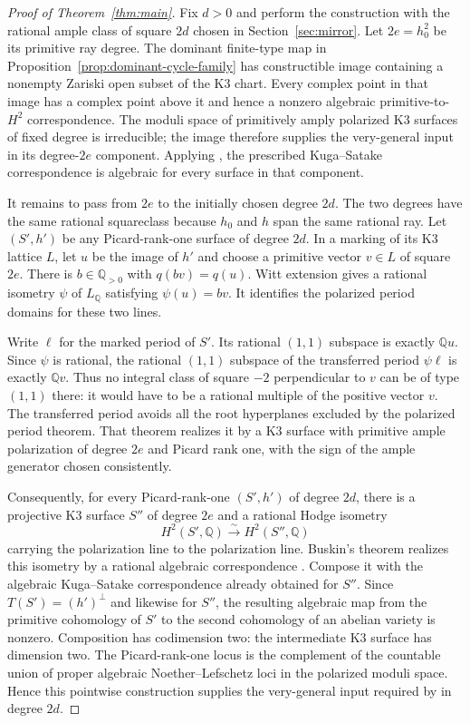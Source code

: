 \documentclass[11pt]{article}
\numberwithin{equation}{section}
\theoremstyle{definition}
\theoremstyle{remark}
\begin{document}
\begin{proof}[Proof of Theorem~\ref{thm:main}]
Fix $d>0$ and perform the construction with the rational ample
class of square $2d$ chosen in Section~\ref{sec:mirror}.
Let $2e=h_0^2$ be its primitive ray degree. The dominant finite-type
map in Proposition~\ref{prop:dominant-cycle-family} has constructible
image containing a nonempty Zariski open subset of the K3 chart.
Every complex point in that image has a complex point above it
and hence a nonzero algebraic primitive-to-$H^2$ correspondence.
The moduli space of primitively amply polarized K3 surfaces of
fixed degree is irreducible; the image therefore supplies the
very-general input in its degree-$2e$ component. Applying
\cite[Theorems~1.1--1.2]{R}, the prescribed Kuga--Satake
correspondence is algebraic for every surface in that component.

It remains to pass from $2e$ to the initially chosen degree $2d$.
The two degrees have the same rational squareclass because $h_0$
and $h$ span the same rational ray. Let $(S',h')$ be any
Picard-rank-one surface of degree $2d$. In a marking of its K3
lattice $L$, let $u$ be the image of $h'$ and choose a primitive
vector $v\in L$ of square $2e$.
There is $b\in\mathbb Q_{>0}$ with $q(bv)=q(u)$. Witt extension gives
a rational isometry $\psi$ of $L_\mathbb Q$ satisfying $\psi(u)=bv$.
It identifies the polarized period domains for these two lines.

Write $\ell$ for the marked period of $S'$. Its rational $(1,1)$ subspace is
exactly $\mathbb Q u$. Since $\psi$ is rational, the rational $(1,1)$
subspace of the transferred period $\psi\ell$ is exactly
$\mathbb Q v$. Thus no integral class of square $-2$ perpendicular to
$v$ can be of type $(1,1)$ there: it would have to be a rational
multiple of the positive vector $v$. The transferred period avoids
all the root hyperplanes excluded by the polarized period theorem.
That theorem realizes it by a K3 surface with primitive ample
polarization of degree $2e$ and Picard rank one, with the sign of
the ample generator chosen consistently.

Consequently, for every Picard-rank-one $(S',h')$ of degree $2d$,
there is a
projective K3 surface $S''$ of degree $2e$ and a rational Hodge
isometry
\[
 H^2(S',\mathbb Q)\xrightarrow{\sim}H^2(S'',\mathbb Q)
\]
carrying the polarization line to the polarization line.
Buskin's theorem realizes this isometry by a rational algebraic
correspondence \cite[Theorem~1.1]{Deformation:Buskin}.
Compose it with the algebraic Kuga--Satake correspondence already
obtained for $S''$. Since $T(S')=(h')^\perp$ and likewise for
$S''$, the resulting algebraic map from the primitive cohomology
of $S'$ to the second cohomology of an abelian variety is nonzero.
Composition has codimension two: the intermediate K3 surface has
dimension two. The Picard-rank-one locus is the complement of the
countable union of proper algebraic Noether--Lefschetz loci in the
polarized moduli space. Hence this pointwise construction supplies
the very-general input required by
\cite[Theorem~1.2]{R} in degree $2d$.


\end{proof}
\end{document}
